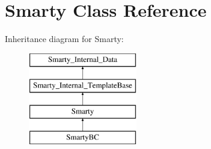 \hypertarget{class_smarty}{}\section{Smarty Class Reference}
\label{class_smarty}
Inheritance diagram for Smarty\+:\begin{figure}[H]
\begin{center}
\leavevmode
\includegraphics[height=4.000000cm]{class_smarty}
\end{center}
\end{figure}
